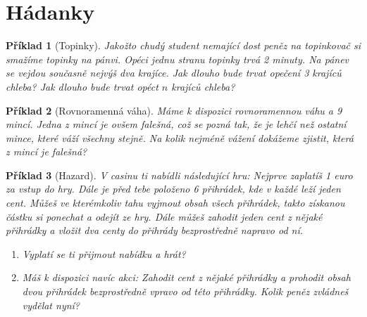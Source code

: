 \documentclass[10pt]{article}
\theoremstyle{definitionstyle}
\theoremstyle{problemstyle}
\newtheorem{problem}{Příklad}
\begin{document}
\section{Hádanky}

\begin{problem}[Topinky]
Jakožto chudý student nemající dost peněz na topinkovač si smažíme topinky na pánvi. Opéci jednu stranu topinky trvá 2 minuty. Na pánev se vejdou současně nejvýš dva krajíce. Jak dlouho bude trvat opečení 3 krajíců chleba? Jak dlouho bude trvat opéct $n$ krajíců chleba?
\end{problem}

\begin{problem}[Rovnoramenná váha]
Máme k dispozici rovnoramennou váhu a 9 mincí. Jedna z mincí je ovšem falešná, což se pozná tak, že je lehčí než ostatní mince, které váží všechny stejně. Na kolik nejméně vážení dokážeme zjistit, která z mincí je falešná?
\end{problem}

\begin{problem}[Hazard]
V casinu ti nabídli následující hru: Nejprve zaplatíš 1 euro za vstup do hry. Dále je před tebe položeno 6 přihrádek, kde v každé leží jeden cent. Můžeš ve kterémkoliv tahu vyjmout obsah všech přihrádek, takto získanou částku si ponechat a odejít ze hry. Dále můžeš zahodit jeden cent z nějaké přihrádky a vložit dva centy do přihrády bezprostředně napravo od ní.

\begin{enumerate}[label=(\alph*)]
\item Vyplatí se ti přijmout nabídku a hrát?
\item Máš k dispozici navíc akci: Zahodit cent z nějaké přihrádky a prohodit obsah dvou přihrádek bezprostředně vpravo od této přihrádky. Kolik peněz zvládneš vydělat nyní?
\end{enumerate}

\end{problem}

\vspace{1cm}
\end{document}
